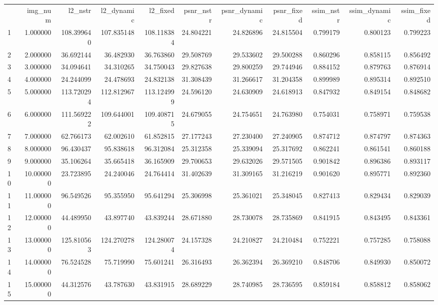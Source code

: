 \begin{tabular}{lrrrrrrrrrr}
 & img_num & l2_nstr & l2_dynamic & l2_fixed & psnr_nstr & psnr_dynamic & psnr_fixed & ssim_nstr & ssim_dynamic & ssim_fixed \\
1 & 1.000000 & 108.399640 & 107.835148 & 108.118384 & 24.804221 & 24.826896 & 24.815504 & 0.799179 & 0.800123 & 0.799223 \\
2 & 2.000000 & 36.692144 & 36.482930 & 36.763860 & 29.508769 & 29.533602 & 29.500288 & 0.860296 & 0.858115 & 0.856492 \\
3 & 3.000000 & 34.094641 & 34.310265 & 34.750043 & 29.827638 & 29.800259 & 29.744946 & 0.884152 & 0.879763 & 0.876914 \\
4 & 4.000000 & 24.244099 & 24.478693 & 24.832138 & 31.308439 & 31.266617 & 31.204358 & 0.899989 & 0.895314 & 0.892510 \\
5 & 5.000000 & 113.720294 & 112.812967 & 113.124999 & 24.596120 & 24.630909 & 24.618913 & 0.847932 & 0.849154 & 0.848682 \\
6 & 6.000000 & 111.569222 & 109.644001 & 109.408715 & 24.679055 & 24.754651 & 24.763980 & 0.754031 & 0.758971 & 0.759538 \\
7 & 7.000000 & 62.766173 & 62.002610 & 61.852815 & 27.177243 & 27.230400 & 27.240905 & 0.874712 & 0.874797 & 0.874363 \\
8 & 8.000000 & 96.430437 & 95.838618 & 96.312084 & 25.312358 & 25.339094 & 25.317692 & 0.862241 & 0.861541 & 0.860188 \\
9 & 9.000000 & 35.106264 & 35.665418 & 36.165909 & 29.700653 & 29.632026 & 29.571505 & 0.901842 & 0.896386 & 0.893117 \\
10 & 10.000000 & 23.723895 & 24.240046 & 24.764414 & 31.402639 & 31.309165 & 31.216219 & 0.901620 & 0.895771 & 0.892360 \\
11 & 11.000000 & 96.549526 & 95.355950 & 95.641294 & 25.306998 & 25.361021 & 25.348045 & 0.827413 & 0.829434 & 0.829039 \\
12 & 12.000000 & 44.489950 & 43.897740 & 43.839244 & 28.671880 & 28.730078 & 28.735869 & 0.841915 & 0.843495 & 0.843361 \\
13 & 13.000000 & 125.810563 & 124.270278 & 124.280074 & 24.157328 & 24.210827 & 24.210484 & 0.752221 & 0.757285 & 0.758088 \\
14 & 14.000000 & 76.524528 & 75.719990 & 75.601241 & 26.316493 & 26.362394 & 26.369210 & 0.848706 & 0.849930 & 0.850072 \\
15 & 15.000000 & 44.312576 & 43.787630 & 43.831915 & 28.689229 & 28.740985 & 28.736595 & 0.859184 & 0.858812 & 0.858062 \\

\end{tabular}

